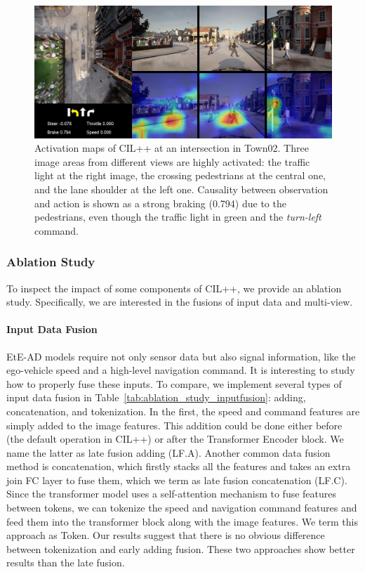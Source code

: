 \begin{figure}[ht!]
	\centering
	\includegraphics[width=\linewidth]{fig/attention_ped_greed.jpg}
	\caption{Activation maps of CIL++ at an intersection in Town02. 
		Three image areas from different views are highly activated: 
		the traffic light at the right image, the crossing pedestrians at the central one, and the lane shoulder at the left one. 
		Causality between observation and action is shown as a strong braking (0.794) due to the pedestrians, even though the traffic light in green and the \emph{turn-left} command.}
	\label{fig:attention_ped_greed}
\end{figure}


\subsubsection{Ablation Study}
\label{sec:Ablation Study}
To inspect the impact of some components of CIL++, we provide an ablation study. 
Specifically, we are interested in the fusions of input data and multi-view. 

\paragraph{Input Data Fusion}
EtE-AD models require not only sensor data but also signal information, like the ego-vehicle speed and a high-level navigation command. 
It is interesting to study how to properly fuse these inputs. 
To compare, we implement several types of input data fusion in Table~\ref{tab:ablation_study_inputfusion}: adding, concatenation, and tokenization. 
In the first, the speed and command features are simply added to the image features. 
This addition could be done either before (the default operation in CIL++) or after the Transformer Encoder block. 
We name the latter as late fusion adding (LF.A). 
Another common data fusion method is concatenation, which firstly stacks all the features and takes an extra join FC layer to fuse them, which we term as late fusion concatenation (LF.C). 
Since the transformer model uses a self-attention mechanism to fuse features between tokens, we can tokenize the speed and navigation command features and feed them into the transformer block along with the image features. 
We term this approach as Token. 
Our results suggest that there is no obvious difference between tokenization and early adding fusion. 
These two approaches show better results than the late fusion.


